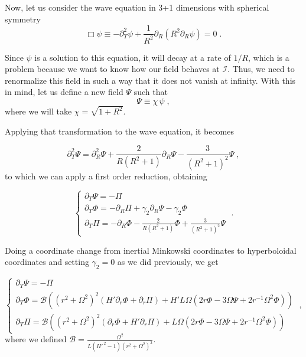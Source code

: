 Now, let us consider the wave equation in 3+1 dimensions with spherical symmetry
\begin{equation}
    \Box \psi \equiv - \partial_T^2 \psi + \frac{1}{R^2} \partial_R\left( R^2 \partial_R \psi\right) = 0 \;.
\end{equation}

Since $\psi$ is a solution to this equation, it will decay at a rate of $1/R$, which is a problem because we want to know how our field behaves at $\mathscr{I}$. Thus, we need to renormalize this field in such a way that it does not vanish at infinity. With this in mind, let us define a new field $\Psi$ such that
$$\Psi \equiv \chi \, \psi \; ,$$
where we will take $\chi = \sqrt{1+R^2}$.

Applying that transformation to the wave equation, it becomes

\begin{equation}
    \partial_T^2 \Psi = \partial_R^2\Psi + \frac{2}{R(R^2+1)} \partial_R\Psi - \frac{3}{(R^2+1)^2} \Psi \;,
\end{equation}
%
to which we can apply a first order reduction, obtaining

\begin{equation}
    \left\{ \begin{array}{l} 
        \partial_T \Psi = - \Pi \\ 
        \partial_T \Phi = - \partial_R \Pi + \gamma_2 \partial_R \Psi - \gamma_2\Phi\\
        \partial_T \Pi = - \partial_R \Phi - \frac{2}{R(R^2+1)}\Phi + \frac{3}{(R^2+1)^2} \Psi
    \end{array} \right. \; .
\end{equation}

Doing a coordinate change from inertial Minkowski coordinates to hyperboloidal coordinates and setting $\gamma_2 = 0$ as we did previously, we get

\begin{equation}
    \left\{ \begin{array}{l} 
        \partial_T \Psi = - \Pi \\ 
        \partial_T \Phi = \mathcal{B}\left((r^2 + \Omega^2)^2 \left(H' \partial_r \Phi + \partial_r\Pi\right) + H' L \Omega \left( 2r\Phi - 3 \Omega \Psi + 2 r^{-1} \Omega^2 \Phi\right)\right)\\
        \partial_T \Pi = \mathcal{B}\left((r^2 + \Omega^2)^2 \left(\partial_r \Phi + H' \partial_r\Pi\right) + L \Omega \left( 2r\Phi - 3 \Omega \Psi + 2 r^{-1} \Omega^2 \Phi\right)\right)
    \end{array} \right. \; ,
\end{equation}
where we defined $\mathcal{B}= \frac{\Omega^2}{L(H'^{\,2}-1)(r^2 + \Omega^2)^2}$. 

